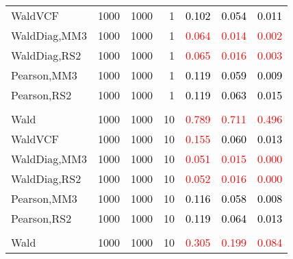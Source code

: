 \documentclass[
]{article}
\begin{document}
\begin{table}[H]
{\begin{tabular}[t]{lrrrrrr}
\hspace{1em}WaldVCF & 1000 & 1000 & 1 & \textcolor{black}{0.102} & \textcolor{black}{0.054} & \textcolor{black}{0.011}\\
\hspace{1em}WaldDiag,MM3 & 1000 & 1000 & 1 & \textcolor{red}{0.064} & \textcolor{red}{0.014} & \textcolor{red}{0.002}\\
\hspace{1em}WaldDiag,RS2 & 1000 & 1000 & 1 & \textcolor{red}{0.065} & \textcolor{red}{0.016} & \textcolor{red}{0.003}\\
\hspace{1em}Pearson,MM3 & 1000 & 1000 & 1 & \textcolor{black}{0.119} & \textcolor{black}{0.059} & \textcolor{black}{0.009}\\
\hspace{1em}Pearson,RS2 & 1000 & 1000 & 1 & \textcolor{black}{0.119} & \textcolor{black}{0.063} & \textcolor{black}{0.015}\\
\addlinespace[0.3em]
\multicolumn{7}{l}{\textbf{1F 15V}}\\
\hspace{1em}Wald & 1000 & 1000 & 10 & \textcolor{red}{0.789} & \textcolor{red}{0.711} & \textcolor{red}{0.496}\\
\hspace{1em}WaldVCF & 1000 & 1000 & 10 & \textcolor{red}{0.155} & \textcolor{black}{0.060} & \textcolor{black}{0.013}\\
\hspace{1em}WaldDiag,MM3 & 1000 & 1000 & 10 & \textcolor{red}{0.051} & \textcolor{red}{0.015} & \textcolor{red}{0.000}\\
\hspace{1em}WaldDiag,RS2 & 1000 & 1000 & 10 & \textcolor{red}{0.052} & \textcolor{red}{0.016} & \textcolor{red}{0.000}\\
\hspace{1em}Pearson,MM3 & 1000 & 1000 & 10 & \textcolor{black}{0.116} & \textcolor{black}{0.058} & \textcolor{black}{0.008}\\
\hspace{1em}Pearson,RS2 & 1000 & 1000 & 10 & \textcolor{black}{0.119} & \textcolor{black}{0.064} & \textcolor{black}{0.013}\\
\addlinespace[0.3em]
\multicolumn{7}{l}{\textbf{2F 10V}}\\
\hspace{1em}Wald & 1000 & 1000 & 10 & \textcolor{red}{0.305} & \textcolor{red}{0.199} & \textcolor{red}{0.084}\\

\end{tabular}}
\end{table}
\end{document}
